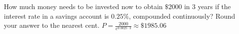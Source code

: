 
{How much money needs to be invested now to obtain $\$2000$ in 3 years if the interest rate in a savings account is $0.25 \%$, compounded continuously?  Round your answer to the nearest cent.}
{$P = \frac{2000}{e^{0.0025 \cdot 3}} \approx \$ 1985.06$}